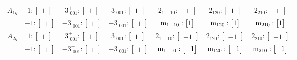 \documentclass[fleqn,8pt,landscape]{jsarticle}
\begin{document}
\begin{longtable}{ccccccc}
$ A_{1g} $ & $ 1:\begin{bmatrix} 1 \end{bmatrix} $ & $ 3^{+}_{\,\,001}:\begin{bmatrix} 1 \end{bmatrix} $ & $ 3^{-}_{\,\,001}:\begin{bmatrix} 1 \end{bmatrix} $ & $ 2{}_{1-10}:\begin{bmatrix} 1 \end{bmatrix} $ & $ 2{}_{120}:\begin{bmatrix} 1 \end{bmatrix} $ & $ 2{}_{210}:\begin{bmatrix} 1 \end{bmatrix} $ \\
& $ -1:\begin{bmatrix} 1 \end{bmatrix} $ & $ -3^{+}_{\,\,001}:\begin{bmatrix} 1 \end{bmatrix} $ & $ -3^{-}_{\,\,001}:\begin{bmatrix} 1 \end{bmatrix} $ & $ {\rm m}_{1-10}:\begin{bmatrix} 1 \end{bmatrix} $ & $ {\rm m}_{120}:\begin{bmatrix} 1 \end{bmatrix} $ & $ {\rm m}_{210}:\begin{bmatrix} 1 \end{bmatrix} $ \\ \hline
$ A_{2g} $ & $ 1:\begin{bmatrix} 1 \end{bmatrix} $ & $ 3^{+}_{\,\,001}:\begin{bmatrix} 1 \end{bmatrix} $ & $ 3^{-}_{\,\,001}:\begin{bmatrix} 1 \end{bmatrix} $ & $ 2{}_{1-10}:\begin{bmatrix} -1 \end{bmatrix} $ & $ 2{}_{120}:\begin{bmatrix} -1 \end{bmatrix} $ & $ 2{}_{210}:\begin{bmatrix} -1 \end{bmatrix} $ \\
& $ -1:\begin{bmatrix} 1 \end{bmatrix} $ & $ -3^{+}_{\,\,001}:\begin{bmatrix} 1 \end{bmatrix} $ & $ -3^{-}_{\,\,001}:\begin{bmatrix} 1 \end{bmatrix} $ & $ {\rm m}_{1-10}:\begin{bmatrix} -1 \end{bmatrix} $ & $ {\rm m}_{120}:\begin{bmatrix} -1 \end{bmatrix} $ & $ {\rm m}_{210}:\begin{bmatrix} -1 \end{bmatrix} $ \\ \hline

\end{longtable}
\end{document}
